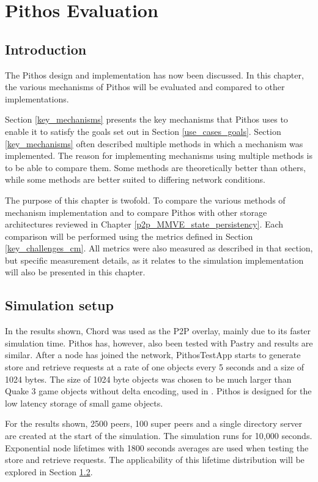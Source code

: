 \chapter{Pithos Evaluation}
    \label{chp:EVALUATION}
\section{Introduction}
The Pithos design and implementation has now been discussed. In this chapter, the various mechanisms of Pithos will be evaluated and compared to other implementations.

Section \ref{key_mechanisms} presents the key mechanisms that Pithos uses to enable it to satisfy the goals set out in Section \ref{use_cases_goals}. Section \ref{key_mechanisms} often described multiple methods in which a mechanism was implemented. The reason for implementing mechanisms using multiple methods is to be able to compare them. Some methods are theoretically better than others, while some methods are better suited to differing network conditions.

The purpose of this chapter is twofold. To compare the various methods of mechanism implementation and to compare Pithos with other storage architectures reviewed in Chapter \ref{p2p_MMVE_state_persistency}. Each comparison will be performed using the metrics defined in Section \ref{key_challenges_cm}. All metrics were also measured as described in that section, but specific measurement details, as it relates to the simulation implementation will also be presented in this chapter.

\section{Simulation setup}
In the results shown, Chord was used as the P2P overlay, mainly due to its faster simulation time. Pithos has, however, also been tested with Pastry and results are similar. After a node has joined the network, PithosTestApp starts to generate store and retrieve requests at a rate of one objects every 5 seconds and a size of 1024 bytes. The size of 1024 byte objects was chosen to be much larger than Quake 3 game objects without delta encoding, used in \cite{Bharambe_Donnybrook}. Pithos is designed for the low latency storage of small game objects.

For the results shown, 2500 peers, 100 super peers and a single directory server are created at the start of the simulation. The simulation runs for 10,000 seconds. Exponential node lifetimes with 1800 seconds averages are used when testing the store and retrieve requests. The applicability of this lifetime distribution will be explored in Section \ref{}.

